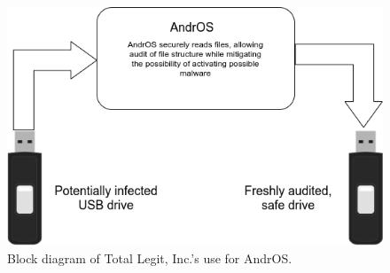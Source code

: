 \begin{figure}[h]
  \centering
  \includegraphics[width=\textwidth]{andrus-totally-legit-diagram.png}
  \caption{Block diagram of Total Legit, Inc.'s use for AndrOS.}
\end{figure}
